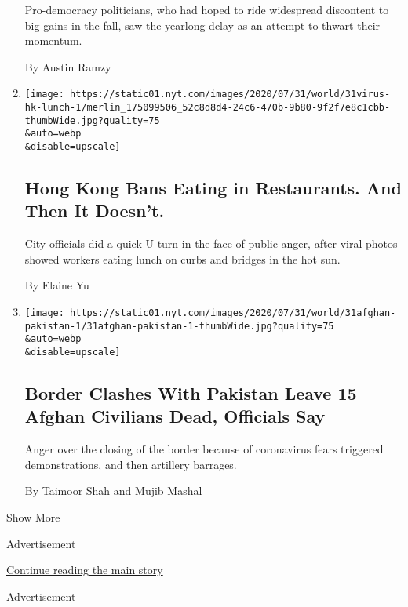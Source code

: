 \begin{enumerate}
  Pro-democracy politicians, who had hoped to ride widespread discontent
  to big gains in the fall, saw the yearlong delay as an attempt to
  thwart their momentum.

  By Austin Ramzy
\item
  \href{/2020/07/31/world/asia/hongkong-dining-lunch-coronavirus.html}{}

  \texttt{[image: https://static01.nyt.com/images/2020/07/31/world/31virus-hk-lunch-1/merlin\_175099506\_52c8d8d4-24c6-470b-9b80-9f2f7e8c1cbb-thumbWide.jpg?quality=75\\\&auto=webp\\\&disable=upscale]}

  \hypertarget{hong-kong-bans-eating-in-restaurants-and-then-it-doesnt}{%
  \subsection{Hong Kong Bans Eating in Restaurants. And Then It
  Doesn't.}\label{hong-kong-bans-eating-in-restaurants-and-then-it-doesnt}}

  City officials did a quick U-turn in the face of public anger, after
  viral photos showed workers eating lunch on curbs and bridges in the
  hot sun.

  By Elaine Yu
\item
  \href{/2020/07/31/world/asia/afghanistan-pakistan-border.html}{}

  \texttt{[image: https://static01.nyt.com/images/2020/07/31/world/31afghan-pakistan-1/31afghan-pakistan-1-thumbWide.jpg?quality=75\\\&auto=webp\\\&disable=upscale]}

  \hypertarget{border-clashes-with-pakistan-leave-15-afghan-civilians-dead-officials-say}{%
  \subsection{Border Clashes With Pakistan Leave 15 Afghan Civilians
  Dead, Officials
  Say}\label{border-clashes-with-pakistan-leave-15-afghan-civilians-dead-officials-say}}

  Anger over the closing of the border because of coronavirus fears
  triggered demonstrations, and then artillery barrages.

  By Taimoor Shah and Mujib Mashal
\end{enumerate}

Show More

Advertisement

\protect\hyperlink{after-mid1}{Continue reading the main story}

Advertisement

